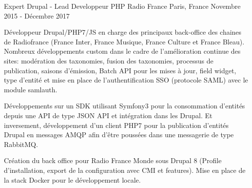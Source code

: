 \cventry
{Expert Drupal - Lead Developpeur PHP} %
{Radio France} %
{Paris, France} %
{Novembre 2015 - Décembre 2017} %
{
\begin{cvitems} %
    \item
    {
        Développeur Drupal/PHP7/JS en charge des principaux back-office des chaines de Radiofrance (France Inter, France Musique, France Culture et France Bleau). Nombreux
        développements custom dans le cadre de l'amélioration continue des sites: modération des taxonomies, fusion des taxonomies, processus de publication, saisons d’émission,
        Batch API pour les mises à jour, field widget, type d'entité et mise en place de l'authentification SSO (protocole SAML) avec le module samlauth.
    }
    \item
    {
        Développements sur un SDK utilisant Symfony3 pour la consommation d’entités depuis une API de type JSON API et intégration dans les Drupal. Et inversement, développement
        d'un client PHP7 pour la publication d'entités Drupal en messages AMQP afin d'être poussées dans une messagerie de type RabbitMQ.
    }
    \item
    {
        Création du back office pour Radio France Monde sous Drupal 8 (Profile d’installation, export de la configuration avec CMI et features). Mise en place de la stack Docker pour
        le développement locale.
    }
\end{cvitems}
}
